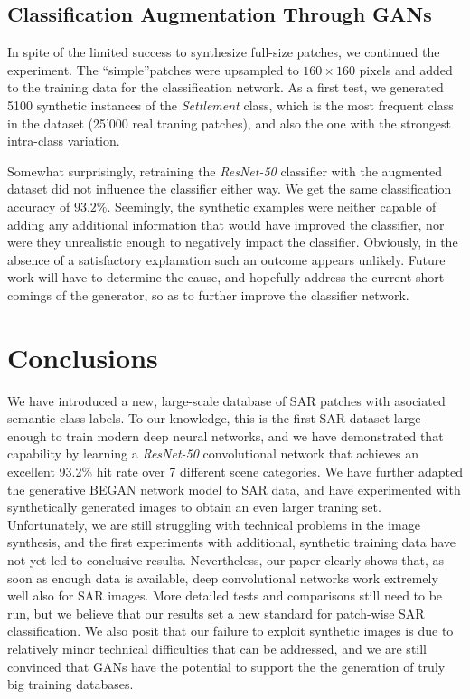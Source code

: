 \documentclass{article}
\begin{document}
\subsection{Classification Augmentation Through GANs}

In spite of the limited success to synthesize full-size patches, we
continued the experiment. The ``simple''patches were upsampled to
$160\times 160$ pixels and added to the training data for the
classification network.
%
As a first test, we generated 5100 synthetic instances of the
\textit{Settlement} class, which is the most frequent class in the
dataset (25'000 real traning patches), and also the one
with the strongest intra-class variation.

\smallskip

\noindent
Somewhat surprisingly, retraining the \emph{ResNet-50} classifier with
the augmented dataset did not influence the classifier either way.
%
We get the same classification accuracy of $93.2\%$. Seemingly, the
synthetic examples were neither capable of adding any additional
information that would have improved the classifier, nor were they
unrealistic enough to negatively impact the classifier.
%
Obviously, in the absence of a satisfactory explanation such an
outcome appears unlikely. Future work will have to determine the
cause, and hopefully address the current short-comings of the
generator, so as to further improve the classifier network.

\section{Conclusions}

We have introduced a new, large-scale database of SAR patches with
asociated semantic class labels. To our knowledge, this is the first
SAR dataset large enough to train modern deep neural networks, and we
have demonstrated that capability by learning a \emph{ResNet-50}
convolutional network that achieves an excellent 93.2\% hit rate over
7 different scene categories.
%
We have further adapted the generative BEGAN network model to SAR
data, and have experimented with synthetically generated images to
obtain an even larger traning set.
%
Unfortunately, we are still struggling with technical problems in the
image synthesis, and the first experiments with additional, synthetic
training data have not yet led to conclusive results.
%
Nevertheless, our paper clearly shows that, as soon as enough data is
available, deep convolutional networks work extremely well also for
SAR images. More detailed tests and comparisons still need to be run,
but we believe that our results set a new standard for patch-wise SAR
classification.
%
We also posit that our failure to exploit synthetic images is due to
relatively minor technical difficulties that can be addressed, and we
are still convinced that GANs have the potential to support the the
generation of truly big training databases.
\end{document}
